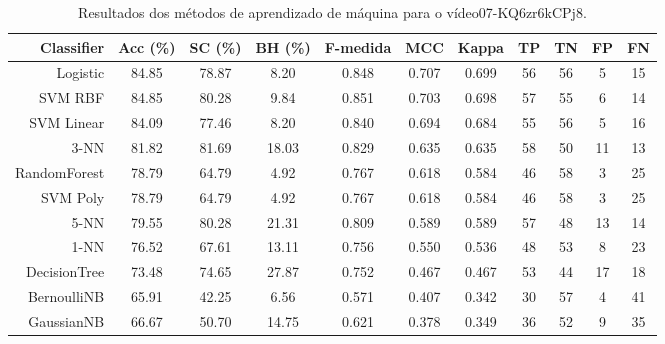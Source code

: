 \begin{table}[!htb]
\centering
\caption{Resultados dos métodos de aprendizado de máquina para o vídeo07-KQ6zr6kCPj8.}
\label{tab:07-KQ6zr6kCPj8}
\begin{tabular}{r|c|c|c|c|c|c|c|c|c|c}
\hline\hline
Classifier & Acc (\%) & SC (\%) & BH (\%) & F-medida & MCC & Kappa & TP & TN & FP & FN \\ \hline
Logistic & 84.85 & 78.87 & 8.20 & 0.848 & 0.707 & 0.699 & 56 & 56 & 5 & 15 \\ 
SVM RBF & 84.85 & 80.28 & 9.84 & 0.851 & 0.703 & 0.698 & 57 & 55 & 6 & 14 \\ 
SVM Linear & 84.09 & 77.46 & 8.20 & 0.840 & 0.694 & 0.684 & 55 & 56 & 5 & 16 \\ 
3-NN & 81.82 & 81.69 & 18.03 & 0.829 & 0.635 & 0.635 & 58 & 50 & 11 & 13 \\ 
RandomForest & 78.79 & 64.79 & 4.92 & 0.767 & 0.618 & 0.584 & 46 & 58 & 3 & 25 \\ 
SVM Poly & 78.79 & 64.79 & 4.92 & 0.767 & 0.618 & 0.584 & 46 & 58 & 3 & 25 \\ 
5-NN & 79.55 & 80.28 & 21.31 & 0.809 & 0.589 & 0.589 & 57 & 48 & 13 & 14 \\ 
1-NN & 76.52 & 67.61 & 13.11 & 0.756 & 0.550 & 0.536 & 48 & 53 & 8 & 23 \\ 
DecisionTree & 73.48 & 74.65 & 27.87 & 0.752 & 0.467 & 0.467 & 53 & 44 & 17 & 18 \\ 
BernoulliNB & 65.91 & 42.25 & 6.56 & 0.571 & 0.407 & 0.342 & 30 & 57 & 4 & 41 \\ 
GaussianNB & 66.67 & 50.70 & 14.75 & 0.621 & 0.378 & 0.349 & 36 & 52 & 9 & 35 \\ 
\hline\hline
\end{tabular}
\end{table}
